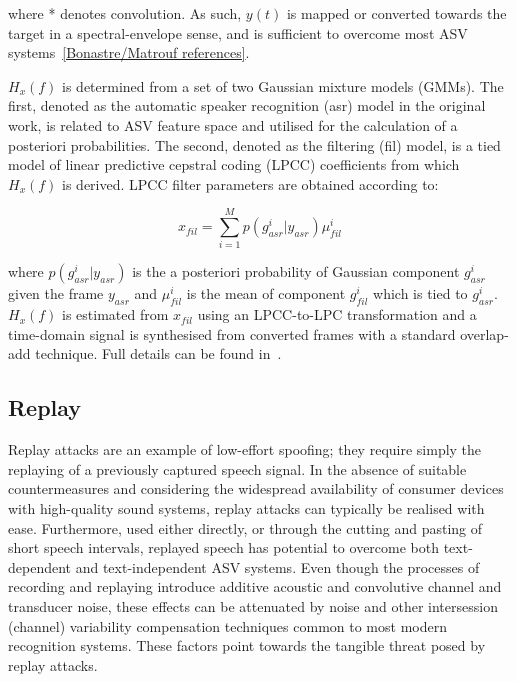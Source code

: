 \noindent where * denotes convolution. As such, $y(t)$ is mapped or converted towards the target in a spectral-envelope sense, and is sufficient to overcome most ASV systems~\ref{Bonastre/Matrouf references}. 

$H_x(f)$ is determined from a set of two Gaussian mixture models (GMMs).  The first, denoted as the automatic speaker recognition (asr) model in the original work, is related to ASV feature space and utilised for the calculation of a posteriori probabilities.  The second, denoted as the filtering (fil) model, is a tied model of linear predictive cepstral coding (LPCC) coefficients from which $H_x(f)$ is derived.  LPCC filter parameters are obtained according to:

\begin{equation}
x_{fil} = \sum\limits_{i=1}^{M}p(g_{asr}^{i}|y_{asr}) \mu_{fil}^{i}
\label{eq:EMit}
\end{equation}

\noindent where $p(g_{asr}^{i}|y_{asr})$ is the a posteriori probability of Gaussian component $g_{asr}^{i}$ given the frame $y_{asr}$ and $\mu_{fil}^{i}$ is the mean of component $g_{fil}^{i}$ which is tied to $g_{asr}^{i}$.  $H_{x}(f)$ is estimated from $x_{fil}$ using an LPCC-to-LPC transformation and a time-domain signal is synthesised from converted frames with a standard overlap-add technique. Full details can be found in~\cite{Matrouf2005, Bonastre2006, Bonastre2007}.


\subsection{Replay}
\label{ssec:replay}

Replay attacks are an example of low-effort spoofing; they require simply the replaying of a previously captured speech signal.  
In the absence of suitable countermeasures and considering the widespread availability of consumer devices with high-quality sound systems, replay attacks can typically be realised with ease.  Furthermore, used either directly, or through the cutting and pasting of short speech intervals, replayed speech has potential to overcome both text-dependent and text-independent ASV systems.  Even though the processes of recording and replaying introduce additive acoustic and convolutive channel and transducer noise, these effects can be attenuated by noise and other intersession (channel) variability compensation techniques common to most modern recognition systems.  These factors point towards the tangible threat posed by replay attacks.

